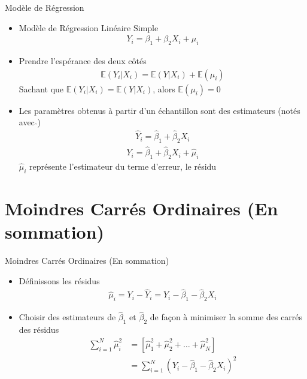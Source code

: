 \documentclass{beamer}
\begin{document}
\begin{frame}{Modèle de Régression}
\begin{itemize}
  \item Modèle de Régression Linéaire Simple 
  \begin{align*}
    Y_i = \beta_1 + \beta_2 X_i + \mu_i 
  \end{align*}
  \item Prendre l'espérance des deux côtés 
  \begin{align*}
    \mathbb{E}(Y_i \vert X_i) = \mathbb{E}(Y \vert X_i) + \mathbb{E}(\mu_i)
  \end{align*}
  Sachant que \( \mathbb{E}(Y_i \vert X_i) = \mathbb{E}(Y \vert X_i) \), alors \( \mathbb{E}(\mu_i) = 0 \)
  \item Les paramètres obtenus à partir d'un échantillon sont des estimateurs (notés avec \( \hat{} \))
  \begin{align*}
    \hat{Y}_i = \hat{\beta}_1 + \hat{\beta}_2 X_i
  \end{align*}
  \begin{align*}
    Y_i = \hat{\beta}_1 + \hat{\beta}_2 X_i + \hat{\mu}_i
  \end{align*}
  \( \hat{\mu}_i \) représente l'estimateur du terme d'erreur, le résidu
\end{itemize}
\end{frame}

\section{Moindres Carrés Ordinaires (En sommation)}
\frame{\tableofcontents[current]}

\begin{frame}{Moindres Carrés Ordinaires (En sommation)}
\begin{itemize}
  \item Définissons les résidus
  \begin{align*}
    \hat{\mu}_i = Y_i - \hat{Y}_i = Y_i - \hat{\beta}_1 - \hat{\beta}_2 X_i
  \end{align*}
  \item Choisir des estimateurs de \( \hat{\beta}_1 \) et \( \hat{\beta}_2 \) de façon à minimiser la somme des carrés des résidus 
  \begin{align*}
    \sum_{i=1}^{N} \hat{\mu}_i^2 & = \left[\hat{\mu}_1^2 + \hat{\mu}_2^2 + \dots + \hat{\mu}_N^2 \right] \\ 
    & = \sum_{i=1}^{N} (Y_i - \hat{\beta}_1 - \hat{\beta}_2 X_i)^2
  \end{align*}
\end{itemize}
\end{frame}
\end{document}
